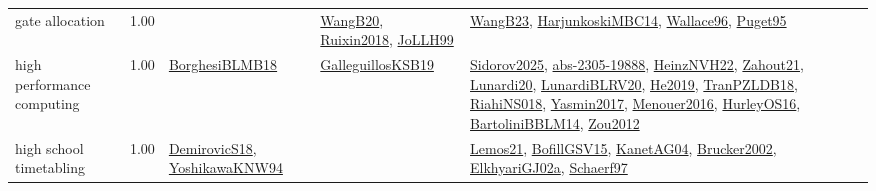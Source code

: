 {\begin{longtable}{p{3cm}r>{\raggedright\arraybackslash}p{6cm}>{\raggedright\arraybackslash}p{6cm}>{\raggedright\arraybackslash}p{8cm}}
\index{gate allocation}\index{ApplicationAreas!gate allocation}gate allocation &  1.00 &  & \hyperref[detail:WangB20]{WangB20}, \hyperref[detail:Ruixin2018]{Ruixin2018}, \hyperref[detail:JoLLH99]{JoLLH99} & \hyperref[detail:WangB23]{WangB23}, \hyperref[detail:HarjunkoskiMBC14]{HarjunkoskiMBC14}, \hyperref[detail:Wallace96]{Wallace96}, \hyperref[detail:Puget95]{Puget95}\\
\index{high performance computing}\index{ApplicationAreas!high performance computing}high performance computing &  1.00 & \hyperref[detail:BorghesiBLMB18]{BorghesiBLMB18} & \hyperref[detail:GalleguillosKSB19]{GalleguillosKSB19} & \hyperref[detail:Sidorov2025]{Sidorov2025}, \hyperref[detail:abs-2305-19888]{abs-2305-19888}, \hyperref[detail:HeinzNVH22]{HeinzNVH22}, \hyperref[detail:Zahout21]{Zahout21}, \hyperref[detail:Lunardi20]{Lunardi20}, \hyperref[detail:LunardiBLRV20]{LunardiBLRV20}, \hyperref[detail:He2019]{He2019}, \hyperref[detail:TranPZLDB18]{TranPZLDB18}, \hyperref[detail:RiahiNS018]{RiahiNS018}, \hyperref[detail:Yasmin2017]{Yasmin2017}, \hyperref[detail:Menouer2016]{Menouer2016}, \hyperref[detail:HurleyOS16]{HurleyOS16}, \hyperref[detail:BartoliniBBLM14]{BartoliniBBLM14}, \hyperref[detail:Zou2012]{Zou2012}\\
\index{high school timetabling}\index{ApplicationAreas!high school timetabling}high school timetabling &  1.00 & \hyperref[detail:DemirovicS18]{DemirovicS18}, \hyperref[detail:YoshikawaKNW94]{YoshikawaKNW94} &  & \hyperref[detail:Lemos21]{Lemos21}, \hyperref[detail:BofillGSV15]{BofillGSV15}, \hyperref[detail:KanetAG04]{KanetAG04}, \hyperref[detail:Brucker2002]{Brucker2002}, \hyperref[detail:ElkhyariGJ02a]{ElkhyariGJ02a}, \hyperref[detail:Schaerf97]{Schaerf97}\\

\end{longtable}}
